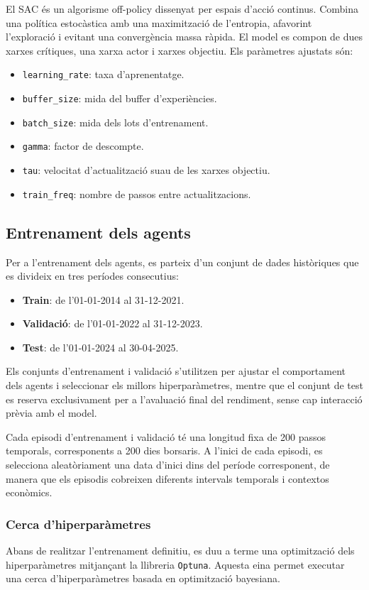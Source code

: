 \documentclass[12pt,a4paper,twoside]{book}
\begin{document}
El SAC és un algorisme off-policy dissenyat per espais d'acció continus. Combina una política estocàstica amb una maximització de l'entropia, afavorint l'exploració i evitant una convergència massa ràpida. El model es compon de dues xarxes crítiques, una xarxa actor i xarxes objectiu. Els paràmetres ajustats són:

\begin{itemize}
    \item \texttt{learning\_rate}: taxa d'aprenentatge.
    \item \texttt{buffer\_size}: mida del buffer d'experiències.
    \item \texttt{batch\_size}: mida dels lots d'entrenament.
    \item \texttt{gamma}: factor de descompte.
    \item \texttt{tau}: velocitat d'actualització suau de les xarxes objectiu.
    \item \texttt{train\_freq}: nombre de passos entre actualitzacions.
\end{itemize}


\subsection{Entrenament dels agents}
Per a l'entrenament dels agents, es parteix d'un conjunt de dades històriques que es divideix en tres períodes consecutius:
\begin{itemize}
\item \textbf{Train}: de l'01-01-2014 al 31-12-2021.
\item \textbf{Validació}: de l'01-01-2022 al 31-12-2023.
\item \textbf{Test}: de l'01-01-2024 al 30-04-2025.
\end{itemize}

Els conjunts d'entrenament i validació s'utilitzen per ajustar el comportament dels agents i seleccionar els millors hiperparàmetres, mentre que el conjunt de test es reserva exclusivament per a l'avaluació final del rendiment, sense cap interacció prèvia amb el model.

Cada episodi d'entrenament i validació té una longitud fixa de 200 passos temporals, corresponents a 200 dies borsaris. A l'inici de cada episodi, es selecciona aleatòriament una data d'inici dins del període corresponent, de manera que els episodis cobreixen diferents intervals temporals i contextos econòmics.


\subsubsection{Cerca d'hiperparàmetres}
Abans de realitzar l'entrenament definitiu, es duu a terme una optimització dels hiperparàmetres mitjançant la llibreria \texttt{Optuna}. Aquesta eina permet executar una cerca d'hiperparàmetres basada en optimització bayesiana.
\end{document}
